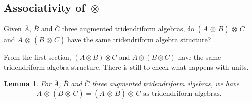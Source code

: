 \documentclass[10pt,a4paper]{amsart}
\numberwithin{equation}{section}
\theoremstyle{definition}
\theoremstyle{plain}
\newtheorem{Lemme}[defi]{Lemma}
\begin{document}
\subsection[Associativity of overline\{otimes\}]{Associativity of $\boldsymbol{\overline{\otimes}}$}

Given $\overline{A}$, $\overline{B}$ and $\overline{C}$ three augmented tridendriform algebras, do $(A\,\overline{\otimes}\, B)\,\overline{\otimes}\, C$ and $A\,\overline{\otimes}\,(B\,\overline{\otimes}\,C)$ have the same tridendriform algebra structure?

From the first section, $(A\otimes B)\otimes C$ and $A\otimes (B\otimes C)$ have the same tridendriform algebra structure. There is still to check what happens with units.

\begin{Lemme}\label{lem:tensassoaugm}
	For $\overline{A}$, $\overline{B}$ and $\overline{C}$ three augmented tridendriform algebras, we have
	\[
	A\,\overline{\otimes}\,(B\,\overline{\otimes}\, C)=(A\,\overline{\otimes}\,B)\,\overline{\otimes}\,C \text{ as tridendriform algebras.}
	\]
\end{Lemme}
\end{document}
